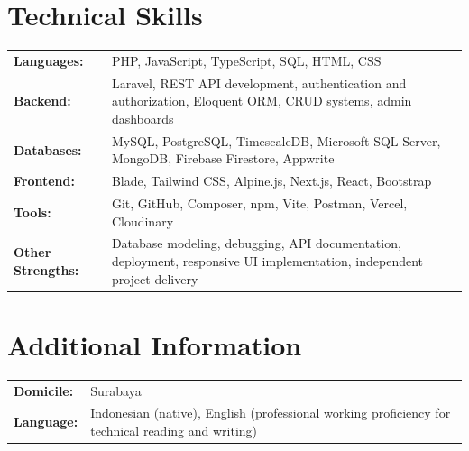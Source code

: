 \documentclass[a4paper,11pt]{article}
\begin{document}
\section{Technical Skills}
\begin{tabularx}{\textwidth}{@{}l X@{}}
\textbf{Languages:} & PHP, JavaScript, TypeScript, SQL, HTML, CSS \\[3pt]
\textbf{Backend:} & Laravel, REST API development, authentication and authorization, Eloquent ORM, CRUD systems, admin dashboards \\[3pt]
\textbf{Databases:} & MySQL, PostgreSQL, TimescaleDB, Microsoft SQL Server, MongoDB, Firebase Firestore, Appwrite \\[3pt]
\textbf{Frontend:} & Blade, Tailwind CSS, Alpine.js, Next.js, React, Bootstrap \\[3pt]
\textbf{Tools:} & Git, GitHub, Composer, npm, Vite, Postman, Vercel, Cloudinary \\[3pt]
\textbf{Other Strengths:} & Database modeling, debugging, API documentation, deployment, responsive UI implementation, independent project delivery \\
\end{tabularx}

\section{Additional Information}
\begin{tabularx}{\textwidth}{@{}l X@{}}
\textbf{Domicile:} & Surabaya \\[3pt]
\textbf{Language:} & Indonesian (native), English (professional working proficiency for technical reading and writing) \\
\end{tabularx}
\end{document}
